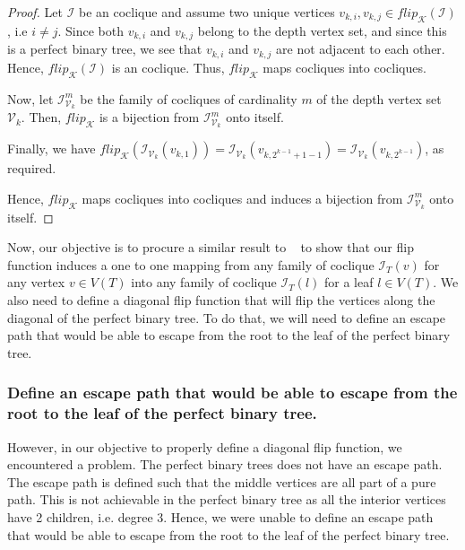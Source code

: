 \documentclass[11pt,a4paper]{article}
\theoremstyle{definition}
\begin{document}
\begin{proof}
	Let $\mathcal{I}$ be an coclique and assume two unique vertices $v_{k, i}, v_{k, j} \in flip_\mathcal{K}(\mathcal{I})$, i.e $i \neq j$. Since both $v_{k, i}$ and $v_{k, j}$ belong to the depth vertex set, and since this is a perfect binary tree, we see that $v_{k, i}$ and $v_{k, j}$ are not adjacent to each other. Hence, $flip_\mathcal{K}(\mathcal{I})$ is an coclique. Thus, $flip_\mathcal{K}$ maps cocliques into cocliques.

	Now, let $\mathcal{I}^m_{\mathcal{V}_k}$ be the family of cocliques of cardinality $m$ of the depth vertex set $\mathcal{V}_k$. Then, $flip_\mathcal{K}$ is a bijection from $\mathcal{I}^m_{\mathcal{V}_k}$ onto itself.

	Finally, we have $flip_\mathcal{K}(\mathcal{I}_{\mathcal{V}_k}(v_{k, 1})) = \mathcal{I}_{\mathcal{V}_k}(v_{k, 2^{k-1} + 1 - 1}) = \mathcal{I}_{\mathcal{V}_k}(v_{k, 2^{k-1}})$, as required.

	Hence, $flip_\mathcal{K}$ maps cocliques into cocliques and induces a bijection from $\mathcal{I}^m_{\mathcal{V}_k}$ onto itself.
\end{proof}


Now, our objective is to procure a similar result to ~\cite{MR4245360} to show that our flip function induces a one to one mapping from any family of coclique $\mathcal{I}_{T}(v)$ for any vertex $v \in V(T)$ into any family of coclique $\mathcal{I}_{T}(l)$ for a leaf $l \in V(T)$. We also need to define a diagonal flip function that will flip the vertices along the diagonal of the perfect binary tree. To do that, we will need to define an escape path that would be able to escape from the root to the leaf of the perfect binary tree.

\subsubsection*{Define an escape path that would be able to escape from the root to the leaf of the perfect binary tree.}

However, in our objective to properly define a diagonal flip function, we encountered a problem. The perfect binary trees does not have an escape path. The escape path is defined such that the middle vertices are all part of a pure path. This is not achievable in the perfect binary tree as all the interior vertices have 2 children, i.e. degree 3. Hence, we were unable to define an escape path that would be able to escape from the root to the leaf of the perfect binary tree.
\end{document}
